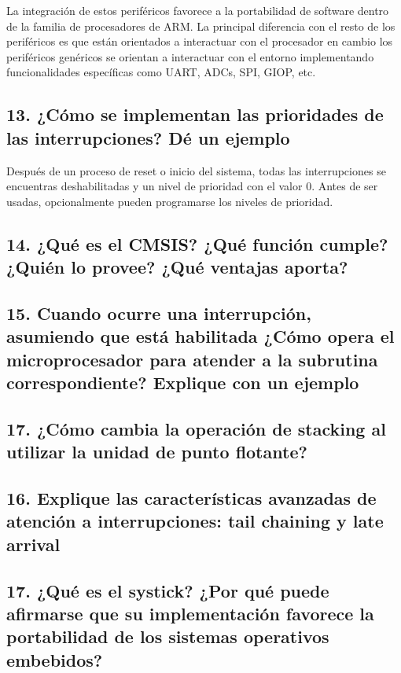 \documentclass[10pt,a4paper,twoside,spanish]{article}	%
\begin{document}
La integración de estos periféricos favorece a la portabilidad de software dentro de la familia de procesadores de ARM. La principal diferencia con el resto de los periféricos es que están orientados a interactuar con el procesador en cambio los periféricos genéricos se orientan a interactuar con el entorno implementando funcionalidades específicas como UART, ADCs, SPI, GIOP, etc.



\subsection*{13. ¿Cómo se implementan las prioridades de las interrupciones? Dé un ejemplo}

Después de un proceso de reset o inicio del sistema, todas las interrupciones se encuentras deshabilitadas y un nivel de prioridad con el valor 0. Antes de ser usadas, opcionalmente pueden programarse los niveles de prioridad.


\subsection*{14. ¿Qué es el CMSIS? ¿Qué función cumple? ¿Quién lo provee? ¿Qué ventajas aporta?}

\subsection*{15. Cuando ocurre una interrupción, asumiendo que está habilitada ¿Cómo opera el microprocesador para atender a la subrutina correspondiente? Explique con un ejemplo}

\subsection*{17. ¿Cómo cambia la operación de stacking al utilizar la unidad de punto flotante?}

\subsection*{16. Explique las características avanzadas de atención a interrupciones: tail chaining y late arrival}

\subsection*{17. ¿Qué es el systick? ¿Por qué puede afirmarse que su implementación favorece la portabilidad de los sistemas operativos embebidos?}
\end{document}

